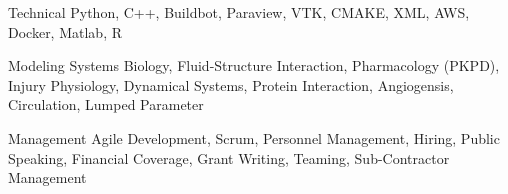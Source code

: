 
\begin{cvskills}
  \cvskill
    {Technical} %
    {Python, C++, Buildbot, Paraview, VTK, CMAKE, XML, AWS, Docker, Matlab, R} %

  \cvskill
    {Modeling} %
    {Systems Biology, Fluid-Structure Interaction, Pharmacology (PKPD), Injury Physiology, Dynamical Systems, Protein Interaction, Angiogensis, Circulation, Lumped Parameter} %

    \cvskill
    {Management} %
    {Agile Development, Scrum, Personnel Management, Hiring, Public Speaking, Financial Coverage, Grant Writing, Teaming, Sub-Contractor Management} %
\end{cvskills}
